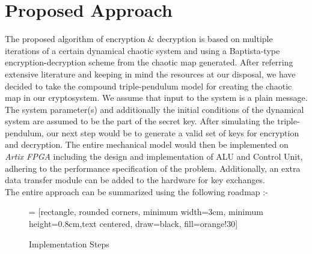 \chapter{Proposed Approach}
\label{chap:system}
\setlength{\parskip}{1.5mm}
The proposed algorithm of encryption \& decryption is based on multiple iterations of a certain dynamical chaotic system and using a Baptista-type encryption-decryption scheme from the chaotic map generated. After referring extensive literature and keeping in mind the resources at our disposal, we have decided to take the compound triple-pendulum model for creating the chaotic map in our cryptosystem. We assume that input to the system is a plain message. The system parameter(s) and additionally the initial conditions of the dynamical system are assumed to be the part of the secret key. After simulating the triple-pendulum, our next step would be to generate a valid set of keys for encryption and decryption. The entire mechanical model would then be implemented on {\em Artix FPGA} including the design and implementation of ALU and Control Unit, adhering to the performance specification of the problem. Additionally, an extra data transfer module can be added to the hardware for key exchanges.\\
The entire approach can be summarized using the following roadmap :- 
\begin{figure}[H]
\vfill
{} = [rectangle, rounded corners, minimum width=3cm, minimum height=0.8cm,text centered, draw=black, fill=orange!30]
\hspace{1.8cm}
\vfill
\caption{Implementation Steps}
\end{figure}
